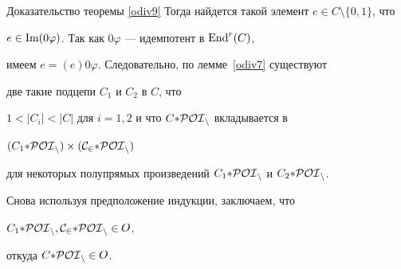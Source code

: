 \begin{pf*}{Доказательство теоремы \ref{odiv9}}
Тогда найдется такой элемент $e\in C\setminus\{0,1\}$, что


$e\in\operatorname{Im}(0\varphi)$. Так как $0\varphi$ --- идемпотент в $\operatorname{End}^r(C)$,


имеем $e=(e)0\varphi$. Следовательно, по лемме~\ref{odiv7} существуют


две такие подцепи $C_1$ и $C_2$ в $C$, что


$1<|C_i|<|C|$ для $i=1,2$ и что $C{*} \cal{POI}_n$ вкладывается в


$(C_1{*} \cal{POI}_n)\times(C_2{*} \cal{POI}_n)$


для некоторых полупрямых произведений $C_1{*} \cal{POI}_n$ и $C_2{*} \cal{POI}_n$.


Снова используя предположение индукции, заключаем, что


$C_1{*} \cal{POI}_n, C_2{*} \cal{POI}_n\in$\,$\boldmath{O}$,


откуда $C{*} \cal{POI}_n\in$\,$\boldmath{O}$.


\end{pf*}





